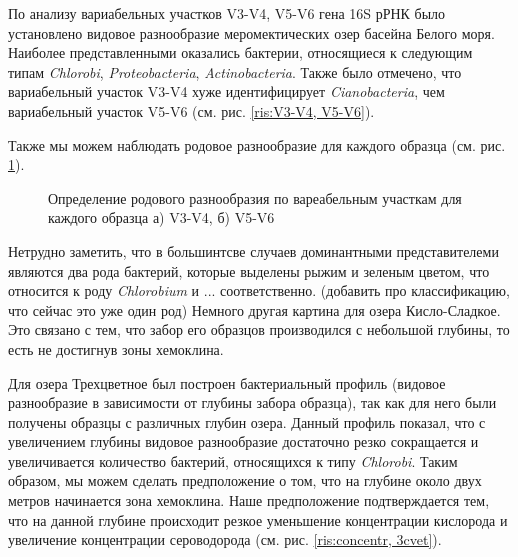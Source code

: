 По анализу вариабельных участков V3-V4, V5-V6 гена 16S рРНК было установлено видовое разнообразие меромектических озер басейна Белого моря. Наиболее представленными оказались бактерии, относящиеся к следующим типам \textit{Chlorobi}, \textit{Proteobacteria}, \textit{Actinobacteria}.  Также было отмечено, что вариабельный участок V3-V4 хуже идентифицирует \textit{Cianobacteria}, чем вариабельный участок V5-V6   (см. рис. \ref{ris:V3-V4, V5-V6}). 

Также мы можем наблюдать родовое разнообразие для каждого образца (см. рис. \ref{ris:taxonomy_V3-V4, V5-V6}).




\begin{figure}[h]
\begin{minipage}[h]{0.5\linewidth}
\end{minipage}
\hfill
\begin{minipage}[h]{0.5\linewidth}
\end{minipage}
\caption{Определение родового разнообразия по вареабельным участкам для каждого образца а) V3-V4, б) V5-V6}
\label{ris:taxonomy_V3-V4, V5-V6}
\end{figure}

Нетрудно заметить, что в большинтсве случаев доминантными представителеми являются два рода бактерий, которые выделены рыжим и зеленым цветом, что относится к роду \textit{Chlorobium} и ... соответственно. (добавить про классификацию, что сейчас это уже один род) Немного другая картина для озера Кисло-Сладкое. Это связано с тем, что забор его образцов производился с небольшой глубины, то есть не достигнув зоны хемоклина. 
  
Для озера Трехцветное был построен бактериальный профиль (видовое разнообразие в зависимости от глубины забора образца), так как для него были получены образцы с различных глубин озера. Данный профиль показал, что с увеличением глубины видовое разнообразие достаточно резко сокращается и увеличивается количество бактерий, относящихся к типу   \textit{Chlorobi}. Таким образом, мы можем сделать предположение о том, что на глубине около двух метров начинается зона хемоклина. Наше предположение подтверждается тем, что на данной глубине происходит резкое уменьшение концентрации кислорода и увеличение концентрации сероводорода (см. рис. \ref{ris:concentr, 3cvet}).  

